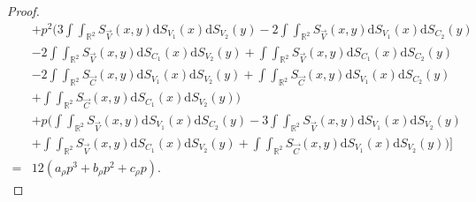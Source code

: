 \begin{proof}
\begin{align*}
        &+p^2\bigg(3\int\int_{\mathbb{R}^2}S_{\vec{V}}\left(x,y\right)\mathrm{d}S_{V_1}\left(x\right)\mathrm{d}S_{V_2}\left(y\right)-2\int\int_{\mathbb{R}^2}S_{\vec{V}}\left(x,y\right)\mathrm{d}S_{V_1}\left(x\right)\mathrm{d}S_{C_2}\left(y\right)\\
        &-2\int\int_{\mathbb{R}^2}S_{\vec{V}}\left(x,y\right)\mathrm{d}S_{C_1}\left(x\right)\mathrm{d}S_{V_2}\left(y\right)+\int\int_{\mathbb{R}^2}S_{\vec{V}}\left(x,y\right)\mathrm{d}S_{C_1}\left(x\right)\mathrm{d}S_{C_2}\left(y\right)\\
        &-2\int\int_{\mathbb{R}^2}S_{\vec{C}}\left(x,y\right)\mathrm{d}S_{V_1}\left(x\right)\mathrm{d}S_{V_2}\left(y\right)+\int\int_{\mathbb{R}^2}S_{\vec{C}}\left(x,y\right)\mathrm{d}S_{V_1}\left(x\right)\mathrm{d}S_{C_2}\left(y\right)\\
        &+\int\int_{\mathbb{R}^2}S_{\vec{C}}\left(x,y\right)\mathrm{d}S_{C_1}\left(x\right)\mathrm{d}S_{V_2}\left(y\right)\bigg)\\
        &+p\bigg(\int\int_{\mathbb{R}^2}S_{\vec{V}}\left(x,y\right)\mathrm{d}S_{V_1}\left(x\right)\mathrm{d}S_{C_2}\left(y\right)-3\int\int_{\mathbb{R}^2}S_{\vec{V}}\left(x,y\right)\mathrm{d}S_{V_1}\left(x\right)\mathrm{d}S_{V_2}\left(y\right)\\
        &+\int\int_{\mathbb{R}^2}S_{\vec{V}}\left(x,y\right)\mathrm{d}S_{C_1}\left(x\right)\mathrm{d}S_{V_2}\left(y\right)+\int\int_{\mathbb{R}^2}S_{\vec{C}}\left(x,y\right)\mathrm{d}S_{V_1}\left(x\right)\mathrm{d}S_{V_2}\left(y\right)\bigg)\bigg]\\
        =&12\left(a_{\rho}p^3+b_{\rho}p^2+c_{\rho}p\right).
    \end{align*}
\end{proof}
